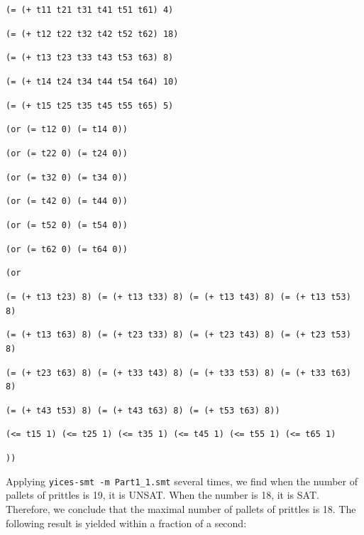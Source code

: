 \documentclass[11pt]{article}
\begin{document}
{{\tt (= (+ t11 t21 t31 t41 t51 t61) 4)}

{\tt (= (+ t12 t22 t32 t42 t52 t62) 18)}

{\tt (= (+ t13 t23 t33 t43 t53 t63) 8)}

{\tt (= (+ t14 t24 t34 t44 t54 t64) 10)}

{\tt (= (+ t15 t25 t35 t45 t55 t65) 5)}

{\tt (or (= t12 0) (= t14 0)) }

{\tt (or (= t22 0) (= t24 0)) }

{\tt (or (= t32 0) (= t34 0)) }

{\tt (or (= t42 0) (= t44 0)) }

{\tt (or (= t52 0) (= t54 0)) }

{\tt (or (= t62 0) (= t64 0)) }

{\tt (or}

{\tt (= (+ t13 t23) 8) (= (+ t13 t33) 8) (= (+ t13 t43) 8) (= (+ t13 t53) 8) }

{\tt (= (+ t13 t63) 8) (= (+ t23 t33) 8) (= (+ t23 t43) 8) (= (+ t23 t53) 8) }

{\tt (= (+ t23 t63) 8) (= (+ t33 t43) 8) (= (+ t33 t53) 8) (= (+ t33 t63) 8) }

{\tt (= (+ t43 t53) 8) (= (+ t43 t63) 8) (= (+ t53 t63) 8)) }

{\tt (<= t15 1) (<= t25 1) (<= t35 1) (<= t45 1) (<= t55 1) (<= t65 1)}

{\tt )) }
}

Applying {\tt yices-smt -m Part1\_1.smt} several times, we find when the number of pallets of prittles is 19, it is UNSAT. When the number is 18, it is SAT. Therefore, we conclude that the maximal number of pallets of prittles is 18.
The following result is yielded within a fraction of a second:
\end{document}

